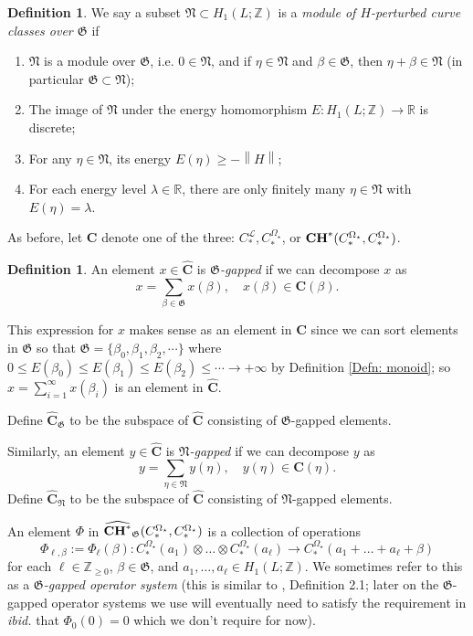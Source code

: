 \documentclass[10pt]{amsart}
\numberwithin{equation}{section}
\theoremstyle{plain}
\theoremstyle{definition}
\newtheorem{definition}[theorem]{Definition}
\theoremstyle{remark}
\numberwithin{equation}{section}
\newcommand{\R}{\mathbb{R}}
\newcommand{\Z}{\mathbb{Z}}
\newcommand{\wh}[1]{\widehat{#1}}
\newcommand{\mf}[1]{\mathfrak{#1}}
\newcommand{\CC}{\textbf{\textup{CH}}}
\newcommand{\norm}[1]{\left\lVert{#1}\right\rVert}
\newcommand{\CFr}{C_*^\mathscr{L}}
\newcommand{\CBa}{C_*^{\Omega_\star}}
\begin{document}
{\begin{definition}\label{Defn: module}
	We say a subset $\mathfrak{N}\subset H_1(L;\Z)$ is a \emph{module of $H$-perturbed curve classes over $\mathfrak{G}$} if
\begin{enumerate}
	\item $\mathfrak{N}$ is a module over $\mathfrak{G}$, i.e.  $0\in \mf{N}$, and if $\eta\in \mathfrak{N}$ and $\beta\in\mathfrak{G}$, then $\eta+\beta\in \mathfrak{N}$ (in particular $\mf{G}\subset \mf{N}$);
	\item The image of $\mathfrak{N}$ under the energy homomorphism $E\colon H_1(L;\Z)\to \R$ is discrete;
	\item For any $\eta\in \mathfrak{N}$, its energy $E(\eta)\geq -\norm{H}$;
	\item For each energy level $\lambda\in \R$, there are only finitely many $\eta\in \mathfrak{N}$ with $E(\eta)=\lambda$. 
\end{enumerate}
\end{definition}


\bigskip

As before, let $\textbf{C}$ denote one of the three: $\CFr,\CBa$, or $\CC^*(\CBa,\CBa)$.

\begin{definition}\label{Defn: G-gapped}
	An element $x\in \wh{\textbf{C}}$ is \emph{$\mathfrak{G}$-gapped} if we can decompose $x$ as 
	\[ x = \sum_{\beta\in\mathfrak{G}} x(\beta), \quad x(\beta)\in \textbf{C}(\beta). \]

	This expression for $x$ makes sense as an element in $\wh{\textbf{C}}$ since we can sort elements in $\mathfrak{G}$ so that $\mathfrak{G} = \{\beta_0,\beta_1,\beta_2,\cdots \}$ where $0\leq E(\beta_0) \leq E(\beta_1)\leq E(\beta_2)\leq \cdots\to  +\infty$ by Definition \ref{Defn: monoid}; so $x=\sum_{i=1}^\infty x(\beta_i)$ is an element in $\wh{\textbf{C}}$.
	
	Define $\wh{\textbf{C}}_\mathfrak{G}$ to be the subspace of $\wh{\textbf{C}}$ consisting of $\mathfrak{G}$-gapped elements. 
	
	Similarly, an element $y\in \wh{\textbf{C}}$  is \emph{$\mathfrak{N}$-gapped} if we can decompose $y$ as \[ y = \sum_{\eta\in\mathfrak{N}} y(\eta),\quad y(\eta)\in \textbf{C}(\eta). \]
	Define $\wh{\textbf{C}}_{\mathfrak{N}}$  to be the subspace of $\wh{\textbf{C}}$ consisting of $\mathfrak{N}$-gapped elements.
\end{definition}

An element $\Phi$ in $\wh{\CC^*}_\mf{G}(\CBa,\CBa)$ is a collection of operations 
\[\Phi_{\ell,\beta}:=\Phi_\ell(\beta)\colon \CBa(a_1)\otimes \dots \otimes \CBa(a_\ell) \to \CBa(a_1+\dots +a_\ell + \beta) \]
for each $\ell\in \Z_{\geq 0}$, $\beta\in \mf{G}$, and $a_1,\dots, a_\ell \in H_1(L;\Z)$. We sometimes refer to this as a \emph{$\mf{G}$-gapped operator system}
(this is similar to \cite{YuanHangThesis}, Definition 2.1; later on the $\mf{G}$-gapped operator systems we use will eventually need to satisfy the requirement in \emph{ibid.} that $\Phi_0(0)=0$ which we don't require for now).


}
\end{document}
